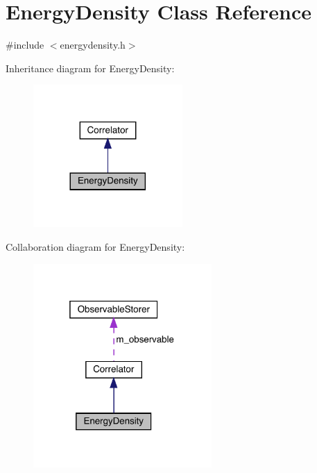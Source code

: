 \hypertarget{class_energy_density}{}\section{Energy\+Density Class Reference}
\label{class_energy_density}


{\ttfamily \#include $<$energydensity.\+h$>$}



Inheritance diagram for Energy\+Density\+:\nopagebreak
\begin{figure}[H]
\begin{center}
\leavevmode
\includegraphics[width=161pt]{class_energy_density__inherit__graph}
\end{center}
\end{figure}


Collaboration diagram for Energy\+Density\+:\nopagebreak
\begin{figure}[H]
\begin{center}
\leavevmode
\includegraphics[width=193pt]{class_energy_density__coll__graph}
\end{center}
\end{figure}
